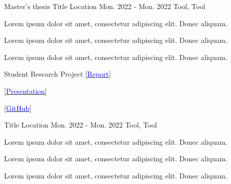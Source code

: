 
\newcommand{\SAreport}{
    \href{Hlink}{[\textcolor{blue}{Report}}]
    }

\newcommand{\SApresentation}{
    \href{Hlink}{[\textcolor{blue}{Presentation}}]
    }

\newcommand{\SArepository}{
    \href{Hlink}{[\textcolor{blue}{GitHub}}]
    }

\begin{cventries}

    
    \cventryprojects
    {Master's thesis} %
    {Title} %
    {Location} %
    {Mon. 2022 - Mon. 2022} %
    {Tool, Tool} %
    {
      \begin{cvitems} %
        \item {Lorem ipsum dolor sit amet, consectetur adipiscing elit. Donec aliquam.}
        \item {Lorem ipsum dolor sit amet, consectetur adipiscing elit. Donec aliquam.}
        \item {Lorem ipsum dolor sit amet, consectetur adipiscing elit. Donec aliquam.}
      \end{cvitems}
    }  
  
  
  \cventryprojects
    {Student Research Project  \SAreport \SApresentation \SArepository }  %
    {Title} %
    {Location} %
    {Mon. 2022 - Mon. 2022} %
    {Tool, Tool} %
    {
      \begin{cvitems} %
        \item {Lorem ipsum dolor sit amet, consectetur adipiscing elit. Donec aliquam.}
        \item {Lorem ipsum dolor sit amet, consectetur adipiscing elit. Donec aliquam.}
        \item {Lorem ipsum dolor sit amet, consectetur adipiscing elit. Donec aliquam.}
      \end{cvitems}
    }


\end{cventries}
